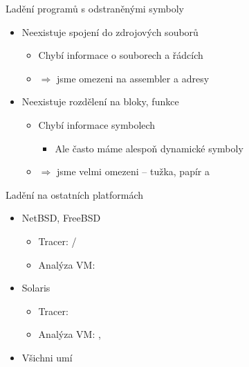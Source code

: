 \begin{frame}{Ladění programů s odstraněnými symboly}

  \begin{itemize}
    \item Neexistuje spojení do zdrojových souborů
    \begin{itemize}
      \item Chybí informace o souborech a řádcích

      \pause

      \item $\Rightarrow$ jsme omezeni na assembler a adresy
    \end{itemize}

    \pause

    \item Neexistuje rozdělení na bloky, funkce
    \begin{itemize}
      \item Chybí informace symbolech
      \begin{itemize}
	\item Ale často máme alespoň dynamické symboly
      \end{itemize}

      \pause

      \item $\Rightarrow$ jsme velmi omezeni -- tužka, papír a 
    \end{itemize}
  \end{itemize}

\end{frame}



\begin{frame}{Ladění na ostatních platformách}

  \begin{itemize}
    \item NetBSD, FreeBSD
    \begin{itemize}
      \item Tracer: /
      \item Analýza VM: 
    \end{itemize}

    \pause

    \item Solaris
    \begin{itemize}
      \item Tracer: 
      \item Analýza VM: , 
    \end{itemize}

    \pause

    \item Všichni umí 
  \end{itemize}

\end{frame}

